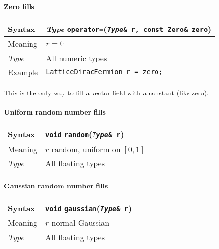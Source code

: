 \documentclass[12pt,letterpaper]{article}
\newcommand{\tLatticeDiracFermion}{LatticeDiracFermion}
\newcommand{\allNumericTypes}{All numeric types}
\newcommand{\allFloatTypes}{All floating types}
\newcommand{\itt}{\it Type}
\begin{document}
\paragraph{Zero fills}

\begin{flushleft}
  \begin{tabular}{|l|l|}
  \hline
  Syntax      & {\it Type} \verb|operator=|({\tt {\it Type}\& r, const Zero\& zero})\\
  \hline
  Meaning     & $r = 0$\\
  \hline
  \itt        & \allNumericTypes \\
  \hline
  Example     & {\tt \tLatticeDiracFermion{} r = zero;}\\
  \hline
  \end{tabular}
\end{flushleft}

This is the only way to fill a vector field with a constant (like zero).

\paragraph{Uniform random number fills}

\begin{flushleft}
  \begin{tabular}{|l|l|}
  \hline
  Syntax      & {\tt void} \verb|random|({\tt {\it Type}\& r}) \\
  \hline
  Meaning     & $r$ random, uniform on $[0,1]$ \\
  \hline
  \itt        & \allFloatTypes \\
  \hline
  \end{tabular}
\end{flushleft}

\paragraph{Gaussian random number fills}

\begin{flushleft}
  \begin{tabular}{|l|l|}
  \hline
  Syntax      & {\tt void} \verb|gaussian|({\tt {\it Type}\& r}) \\
  \hline
  Meaning     & $r$ normal Gaussian \\
  \hline
  \itt        & \allFloatTypes \\
  \hline
  \end{tabular}
\end{flushleft}
\end{document}
